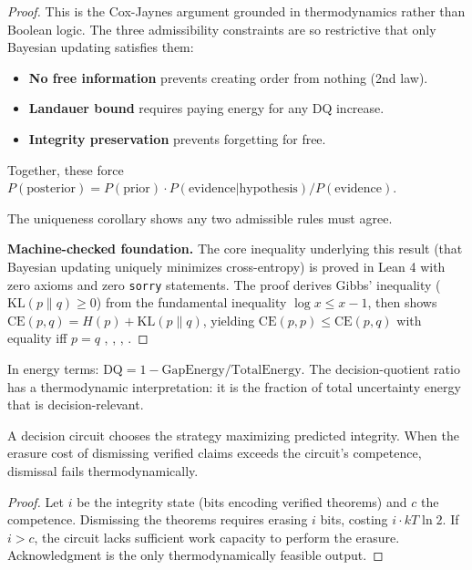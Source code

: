 \begin{proof}
This is the Cox-Jaynes argument grounded in thermodynamics rather than Boolean logic.
The three admissibility constraints are so restrictive that only Bayesian updating satisfies them:
\begin{itemize}
  \item \textbf{No free information} prevents creating order from nothing (2nd law).
  \item \textbf{Landauer bound} requires paying energy for any DQ increase.
  \item \textbf{Integrity preservation} prevents forgetting for free.
\end{itemize}
Together, these force $P(\text{posterior}) = P(\text{prior}) \cdot P(\text{evidence}|\text{hypothesis}) / P(\text{evidence})$.

The uniqueness corollary  shows any two admissible rules must agree.

\textbf{Machine-checked foundation.} The core inequality underlying this result (that Bayesian updating uniquely minimizes cross-entropy) is proved in Lean 4 with zero axioms and zero \texttt{sorry} statements. The proof derives Gibbs' inequality ($\mathrm{KL}(p\|q) \geq 0$) from the fundamental inequality $\log x \leq x - 1$, then shows $\mathrm{CE}(p,q) = H(p) + \mathrm{KL}(p\|q)$, yielding $\mathrm{CE}(p,p) \leq \mathrm{CE}(p,q)$ with equality iff $p = q$ , , , .
\end{proof}

\begin{corollary}\label{cor:thermo-dq}
In energy terms: $\mathrm{DQ} = 1 - \text{GapEnergy}/\text{TotalEnergy}$. The decision-quotient ratio has a thermodynamic interpretation: it is the fraction of total uncertainty energy that is decision-relevant.
\end{corollary}

\begin{proposition}\label{prop:landauer-constraint}
A decision circuit chooses the strategy maximizing predicted integrity. When the erasure cost of dismissing verified claims exceeds the circuit's competence, dismissal fails thermodynamically.
\end{proposition}

\begin{proof}
Let $i$ be the integrity state (bits encoding verified theorems) and $c$ the competence. Dismissing the theorems requires erasing $i$ bits, costing $i \cdot kT\ln 2$. If $i > c$, the circuit lacks sufficient work capacity to perform the erasure. Acknowledgment is the only thermodynamically feasible output.
\end{proof}

